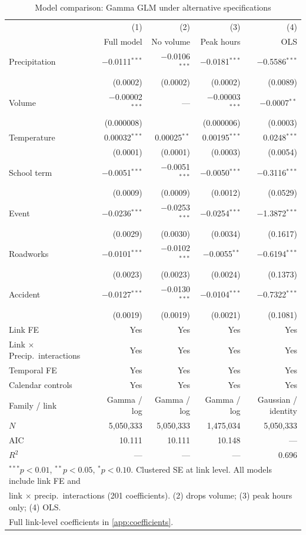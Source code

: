 \documentclass[review,authoryear]{elsarticle}
\begin{document}
\begin{table}[H]
\centering
\caption{Model comparison: Gamma GLM under alternative specifications}
\label{tab:robust}
\begin{tabular}{lrrrr}
\toprule
 & (1) & (2) & (3) & (4) \\
 & Full model & No volume & Peak hours & OLS \\
\midrule
Precipitation & $-$0.0111$^{***}$ & $-$0.0106$^{***}$ & $-$0.0181$^{***}$ & $-$0.5586$^{***}$ \\
 & (0.0002) & (0.0002) & (0.0002) & (0.0089) \\[3pt]
Volume & $-$0.00002$^{***}$ & --- & $-$0.00003$^{***}$ & $-$0.0007$^{**}$ \\
 & (0.000008) & & (0.000006) & (0.0003) \\[3pt]
Temperature & 0.00032$^{***}$ & 0.00025$^{**}$ & 0.00195$^{***}$ & 0.0248$^{***}$ \\
 & (0.0001) & (0.0001) & (0.0003) & (0.0054) \\[3pt]
School term & $-$0.0051$^{***}$ & $-$0.0051$^{***}$ & $-$0.0050$^{***}$ & $-$0.3116$^{***}$ \\
 & (0.0009) & (0.0009) & (0.0012) & (0.0529) \\[3pt]
Event & $-$0.0236$^{***}$ & $-$0.0253$^{***}$ & $-$0.0254$^{***}$ & $-$1.3872$^{***}$ \\
 & (0.0029) & (0.0030) & (0.0034) & (0.1617) \\[3pt]
Roadworks & $-$0.0101$^{***}$ & $-$0.0102$^{***}$ & $-$0.0055$^{**}$ & $-$0.6194$^{***}$ \\
 & (0.0023) & (0.0023) & (0.0024) & (0.1373) \\[3pt]
Accident & $-$0.0127$^{***}$ & $-$0.0130$^{***}$ & $-$0.0104$^{***}$ & $-$0.7322$^{***}$ \\
 & (0.0019) & (0.0019) & (0.0021) & (0.1081) \\
\midrule
Link FE & Yes & Yes & Yes & Yes \\
Link $\times$ Precip.\ interactions & Yes & Yes & Yes & Yes \\
Temporal FE & Yes & Yes & Yes & Yes \\
Calendar controls & Yes & Yes & Yes & Yes \\
Family / link & Gamma / log & Gamma / log & Gamma / log & Gaussian / identity \\
$N$ & 5{,}050{,}333 & 5{,}050{,}333 & 1{,}475{,}034 & 5{,}050{,}333 \\
AIC & 10.111 & 10.111 & 10.148 & --- \\
$R^2$ & --- & --- & --- & 0.696 \\
\bottomrule
\multicolumn{5}{l}{\footnotesize $^{***}p < 0.01$, $^{**}p < 0.05$, $^{*}p < 0.10$. Clustered SE at link level. All models include link FE and} \\
\multicolumn{5}{l}{\footnotesize link $\times$ precip.\ interactions (201 coefficients). (2) drops volume; (3) peak hours only; (4) OLS.} \\
\multicolumn{5}{l}{\footnotesize Full link-level coefficients in \ref{app:coefficients}.} \\
\end{tabular}
\end{table}
\end{document}
